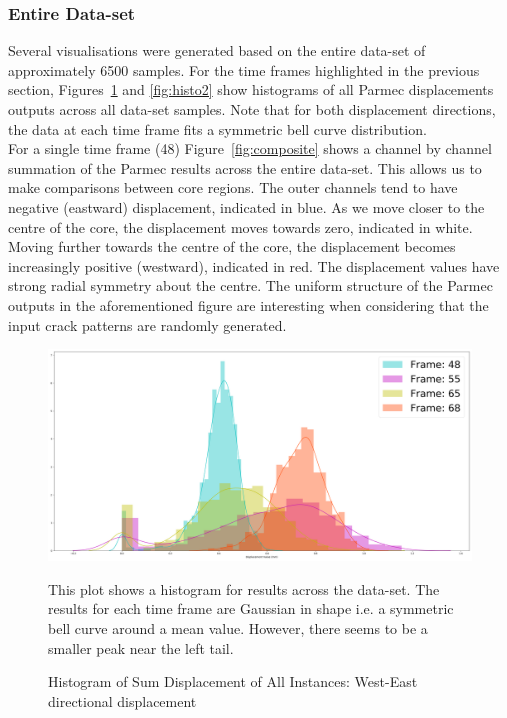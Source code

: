 \subsubsection{Entire Data-set} \label{data:entire}


Several visualisations were generated based on the entire data-set of approximately 6500 samples. For the time frames highlighted in the previous section, Figures~\ref{fig:histo1} and \ref{fig:histo2} show histograms of all Parmec displacements outputs across all data-set samples. Note that for both displacement directions, the data at each time frame fits a symmetric bell curve distribution. 
\\

\noindent
For a single time frame (48) Figure~\ref{fig:composite} shows a channel by channel summation of the Parmec results across the entire data-set. This allows us to make comparisons between core regions. The outer channels tend to have negative (eastward) displacement, indicated in blue. As we move closer to the centre of the core, the displacement moves towards zero, indicated in white. Moving further towards the centre of the core, the displacement becomes increasingly positive (westward), indicated in red. The displacement values have strong radial symmetry about the centre. The uniform structure of the Parmec outputs in the aforementioned figure are interesting when considering that the input crack patterns are randomly generated.  
\\


\begin{figure}[p]
	\centering
	\includegraphics[scale=0.15]{Figures/histo1.png}
	\caption{Histogram of Sum Displacement of All Instances: West-East directional displacement } {This plot shows a histogram for results across the data-set. The results for each time frame are Gaussian in shape i.e. a symmetric bell curve around a mean value. However, there seems to be a smaller peak near the left tail.}
	\label{fig:histo1}
\end{figure}


